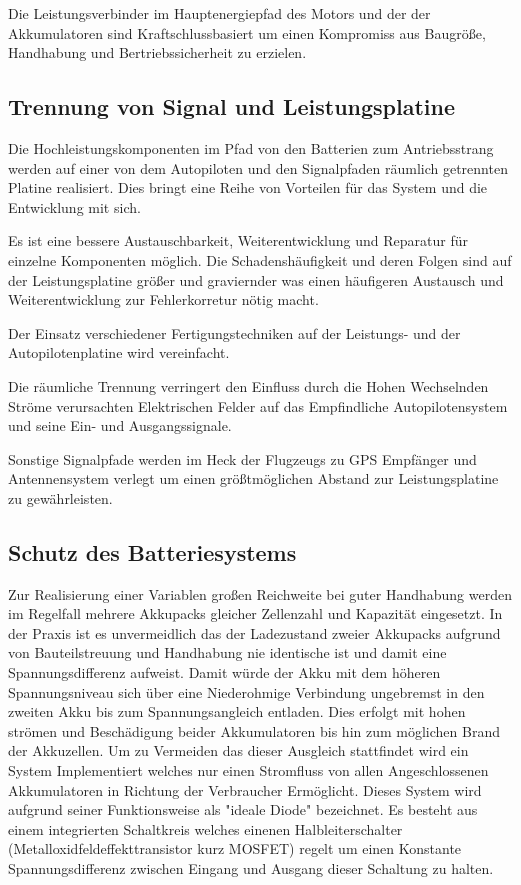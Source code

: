Die Leistungsverbinder im Hauptenergiepfad des Motors und der der Akkumulatoren sind Kraftschlussbasiert um einen Kompromiss aus Baugröße, Handhabung und Bertriebssicherheit zu erzielen.

\subsection{Trennung von Signal und Leistungsplatine}

Die  Hochleistungskomponenten im Pfad von den Batterien zum Antriebsstrang werden auf einer von dem Autopiloten und den Signalpfaden räumlich getrennten Platine realisiert. Dies bringt eine Reihe von Vorteilen für das System und die Entwicklung mit sich.

Es ist eine bessere Austauschbarkeit, Weiterentwicklung und Reparatur für einzelne Komponenten möglich.
Die Schadenshäufigkeit und deren Folgen sind auf der Leistungsplatine größer und graviernder was einen häufigeren 
Austausch und Weiterentwicklung zur Fehlerkorretur nötig macht.

Der Einsatz verschiedener Fertigungstechniken auf der Leistungs- und der Autopilotenplatine wird vereinfacht.

Die räumliche Trennung verringert den Einfluss durch die Hohen Wechselnden Ströme verursachten Elektrischen Felder auf das Empfindliche Autopilotensystem und seine Ein- und Ausgangssignale.

Sonstige Signalpfade werden im Heck der Flugzeugs zu GPS Empfänger und Antennensystem verlegt um einen größtmöglichen Abstand zur Leistungsplatine zu gewährleisten.

\subsection{Schutz des Batteriesystems}

Zur Realisierung einer Variablen großen Reichweite bei guter Handhabung werden im Regelfall mehrere Akkupacks gleicher Zellenzahl und Kapazität eingesetzt.
In der Praxis ist es unvermeidlich das der Ladezustand zweier Akkupacks aufgrund von Bauteilstreuung und Handhabung nie identische ist und damit eine Spannungsdifferenz aufweist. Damit würde der Akku mit dem höheren Spannungsniveau sich über eine Niederohmige Verbindung ungebremst in den zweiten Akku bis zum Spannungsangleich entladen. Dies erfolgt mit  hohen strömen und Beschädigung beider Akkumulatoren bis hin zum möglichen Brand der Akkuzellen.
Um zu Vermeiden das dieser Ausgleich stattfindet wird ein System Implementiert welches nur einen Stromfluss von allen Angeschlossenen Akkumulatoren in Richtung der Verbraucher Ermöglicht.
Dieses System wird aufgrund seiner Funktionsweise als "ideale Diode" bezeichnet. Es besteht aus einem integrierten Schaltkreis welches einenen Halbleiterschalter (Metalloxidfeldeffekttransistor kurz MOSFET) regelt um einen Konstante Spannungsdifferenz zwischen Eingang und Ausgang dieser Schaltung zu halten.

